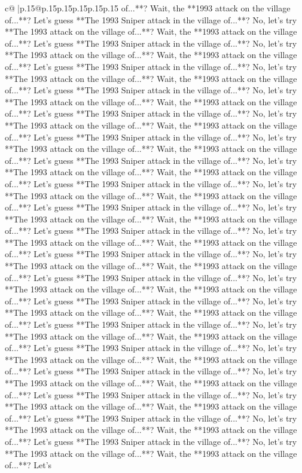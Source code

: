 \documentclass{article}
\begin{document}
{\begin{supertabular}{c@{$\;$}|p{.15\linewidth}@{}p{.15\linewidth}p{.15\linewidth}p{.15\linewidth}p{.15\linewidth}p{.15\linewidth}}
{{{of...**? Wait, the **1993 attack on the village of...**? Let's guess **The 1993 Sniper attack in the village of...**? No, let's try **The 1993 attack on the village of...**? Wait, the **1993 attack on the village of...**? Let's guess **The 1993 Sniper attack in the village of...**? No, let's try **The 1993 attack on the village of...**? Wait, the **1993 attack on the village of...**? Let's guess **The 1993 Sniper attack in the village of...**? No, let's try **The 1993 attack on the village of...**? Wait, the **1993 attack on the village of...**? Let's guess **The 1993 Sniper attack in the village of...**? No, let's try **The 1993 attack on the village of...**? Wait, the **1993 attack on the village of...**? Let's guess **The 1993 Sniper attack in the village of...**? No, let's try **The 1993 attack on the village of...**? Wait, the **1993 attack on the village of...**? Let's guess **The 1993 Sniper attack in the village of...**? No, let's try **The 1993 attack on the village of...**? Wait, the **1993 attack on the village of...**? Let's guess **The 1993 Sniper attack in the village of...**? No, let's try **The 1993 attack on the village of...**? Wait, the **1993 attack on the village of...**? Let's guess **The 1993 Sniper attack in the village of...**? No, let's try **The 1993 attack on the village of...**? Wait, the **1993 attack on the village of...**? Let's guess **The 1993 Sniper attack in the village of...**? No, let's try **The 1993 attack on the village of...**? Wait, the **1993 attack on the village of...**? Let's guess **The 1993 Sniper attack in the village of...**? No, let's try **The 1993 attack on the village of...**? Wait, the **1993 attack on the village of...**? Let's guess **The 1993 Sniper attack in the village of...**? No, let's try **The 1993 attack on the village of...**? Wait, the **1993 attack on the village of...**? Let's guess **The 1993 Sniper attack in the village of...**? No, let's try **The 1993 attack on the village of...**? Wait, the **1993 attack on the village of...**? Let's guess **The 1993 Sniper attack in the village of...**? No, let's try **The 1993 attack on the village of...**? Wait, the **1993 attack on the village of...**? Let's guess **The 1993 Sniper attack in the village of...**? No, let's try **The 1993 attack on the village of...**? Wait, the **1993 attack on the village of...**? Let's guess **The 1993 Sniper attack in the village of...**? No, let's try **The 1993 attack on the village of...**? Wait, the **1993 attack on the village of...**? Let's guess **The 1993 Sniper attack in the village of...**? No, let's try **The 1993 attack on the village of...**? Wait, the **1993 attack on the village of...**? Let's guess **The 1993 Sniper attack in the village of...**? No, let's try **The 1993 attack on the village of...**? Wait, the **1993 attack on the village of...**? Let's guess **The 1993 Sniper attack in the village of...**? No, let's try **The 1993 attack on the village of...**? Wait, the **1993 attack on the village of...**? Let's guess **The 1993 Sniper attack in the village of...**? No, let's try **The 1993 attack on the village of...**? Wait, the **1993 attack on the village of...**? Let's }}}
\end{supertabular}}
\end{document}
